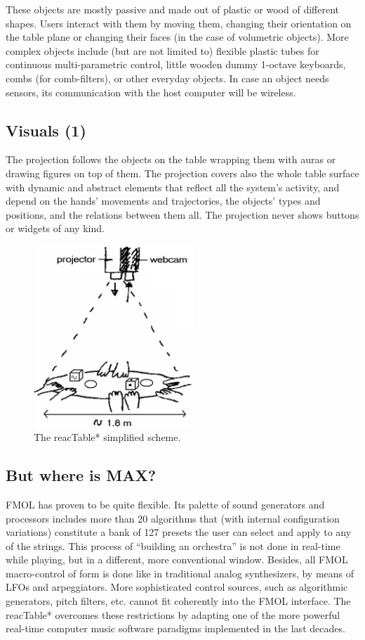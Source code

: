 These objects are mostly passive and made out of plastic  or wood of different
shapes. Users interact with them by moving them,  changing  their  orientation 
on   the   table   plane   or changing their faces (in the case of volumetric
objects). More complex  objects  include  (but  are  not  limited  to)  flexible
plastic tubes for continuous multi-parametric control, little wooden dummy
1-octave keyboards, combs (for comb-filters), or other everyday objects. In case
an object needs sensors, its communication with the host computer will be
wireless.

\subsection{Visuals (1)}

The projection  follows  the  objects  on  the  table  wrapping them with auras
or drawing figures on top of them. The projection covers also the  whole table 
surface with dynamic and abstract elements that reflect all the system's
activity, and depend on the hands' movements and trajectories, the objects' types
and positions, and the relations  between them all. The projection never shows buttons or widgets of any kind.

\begin{figure}[t]
\centering
\includegraphics[width=60mm]{Fig6.png}
\caption{The reacTable* simplified scheme.}
\label{Jorda:fig:reactable-simplified} 
\end{figure}


\subsection{But where is MAX?}

FMOL has proven to be quite flexible. Its palette of sound generators and
processors includes  more than  20  algorithms that (with internal configuration 
variations)  constitute a bank of  127  presets the  user  can  select and 
apply to  any  of  the strings. This process of ``building an orchestra'' is not
done in real-time while playing, but in a different, more conventional window.
Besides, all FMOL macro-control of form is done like in traditional analog
synthesizers, by means of LFOs and arpeggiators. More sophisticated control
sources, such as algorithmic generators, pitch filters, etc. cannot fit
coherently into the FMOL interface. The reacTable* overcomes these restrictions
by adapting one of the more powerful real-time computer music software paradigms
implemented in the last decades.

